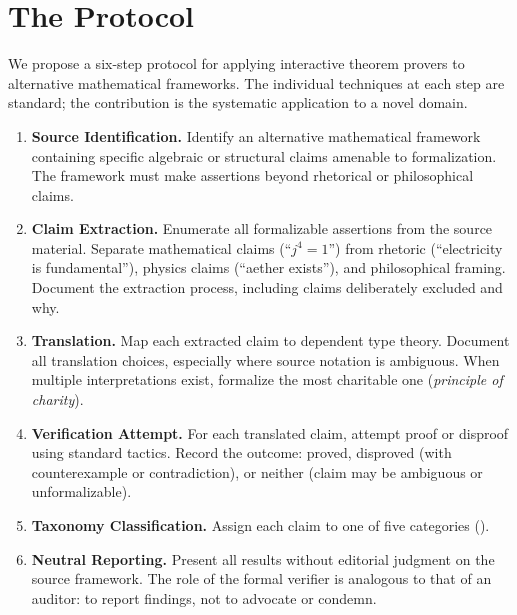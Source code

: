 \documentclass[runningheads]{llncs}
\begin{document}
\section{The Protocol}
\label{sec:protocol}

We propose a six-step protocol for applying interactive theorem provers to
alternative mathematical frameworks. The individual techniques at each step are
standard; the contribution is the systematic application to a novel domain.

\begin{enumerate}
\item \textbf{Source Identification.} Identify an alternative mathematical
  framework containing specific algebraic or structural claims amenable to
  formalization. The framework must make assertions beyond rhetorical or
  philosophical claims.

\item \textbf{Claim Extraction.} Enumerate all formalizable assertions from the
  source material. Separate mathematical claims (``$j^4 = 1$'') from rhetoric
  (``electricity is fundamental''), physics claims (``aether exists''), and
  philosophical framing. Document the extraction process, including claims
  deliberately excluded and why.

\item \textbf{Translation.} Map each extracted claim to dependent type theory.
  Document all translation choices, especially where source notation is ambiguous.
  When multiple interpretations exist, formalize the most charitable one
  (\emph{principle of charity}).

\item \textbf{Verification Attempt.} For each translated claim, attempt proof
  or disproof using standard tactics. Record the outcome: proved, disproved
  (with counterexample or contradiction), or neither (claim may be ambiguous
  or unformalizable).

\item \textbf{Taxonomy Classification.} Assign each claim to one of five
  categories ().

\item \textbf{Neutral Reporting.} Present all results without editorial judgment
  on the source framework. The role of the formal verifier is analogous to that
  of an auditor: to report findings, not to advocate or condemn.
\end{enumerate}
\end{document}
